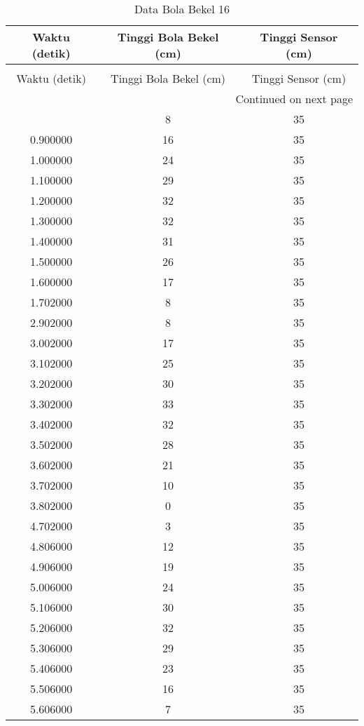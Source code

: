 \begin{longtable}[htbp]{|c|c|c|}
\caption{Data Bola Bekel 16} \\
\hline
Waktu (detik) & Tinggi Bola Bekel (cm) & Tinggi Sensor (cm) \\ \hline
\endfirsthead
\caption[]{Data Bola Bekel 16} \\
\hline
Waktu (detik) & Tinggi Bola Bekel (cm) & Tinggi Sensor (cm) \\ \hline
\endhead
\multicolumn{3}{r}{Continued on next page} \\
\endfoot
\endlastfoot
0.800000 & 8 & 35 \\ \hline
0.900000 & 16 & 35 \\ \hline
1.000000 & 24 & 35 \\ \hline
1.100000 & 29 & 35 \\ \hline
1.200000 & 32 & 35 \\ \hline
1.300000 & 32 & 35 \\ \hline
1.400000 & 31 & 35 \\ \hline
1.500000 & 26 & 35 \\ \hline
1.600000 & 17 & 35 \\ \hline
1.702000 & 8 & 35 \\ \hline
2.902000 & 8 & 35 \\ \hline
3.002000 & 17 & 35 \\ \hline
3.102000 & 25 & 35 \\ \hline
3.202000 & 30 & 35 \\ \hline
3.302000 & 33 & 35 \\ \hline
3.402000 & 32 & 35 \\ \hline
3.502000 & 28 & 35 \\ \hline
3.602000 & 21 & 35 \\ \hline
3.702000 & 10 & 35 \\ \hline
3.802000 & 0 & 35 \\ \hline
4.702000 & 3 & 35 \\ \hline
4.806000 & 12 & 35 \\ \hline
4.906000 & 19 & 35 \\ \hline
5.006000 & 24 & 35 \\ \hline
5.106000 & 30 & 35 \\ \hline
5.206000 & 32 & 35 \\ \hline
5.306000 & 29 & 35 \\ \hline
5.406000 & 23 & 35 \\ \hline
5.506000 & 16 & 35 \\ \hline
5.606000 & 7 & 35 \\ \hline

\end{longtable}
